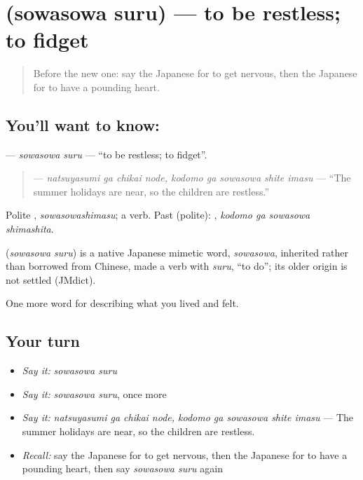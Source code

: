 \section[\texorpdfstring{\ja{そわそわする} (sowasowa suru)}{そわそわする (sowasowa suru)}]{ (sowasowa suru) — to be restless; to fidget}

\label{lesson:JA-C427-sowasowa-suru}



\begin{quote}
Before the new one: say the Japanese for to get nervous, then the Japanese for to have a pounding heart.
\end{quote}

\subsection*{You'll want to know: }
\textbf{} — \emph{sowasowa suru} — \textquotedblleft{}to be restless; to fidget\textquotedblright{}.

\begin{quote}
\textbf{  } — \emph{natsuyasumi ga chikai node, kodomo ga sowasowa shite imasu} — \textquotedblleft{}The summer holidays are near, so the children are restless.\textquotedblright{}
\end{quote}

Polite \textbf{}, \emph{sowasowashimasu}; a  verb. Past (polite): \textbf{ }, \emph{kodomo ga sowasowa shimashita}.

\begin{cousinweb}
\textbf{} (\emph{sowasowa suru}) is a native Japanese mimetic word, \emph{sowasowa}, inherited rather than borrowed from Chinese, made a verb with \emph{suru}, \textquotedblleft{}to do\textquotedblright{}; its older origin is not settled (JMdict).
\end{cousinweb}

\begin{grammarlens}[title={What you've built}]
One more word for describing what you lived and felt.
\end{grammarlens}

\subsection*{Your turn}
\begin{itemize}
\raggedright
  \item \emph{Say it:} \emph{sowasowa suru}
  \item \emph{Say it:} \emph{sowasowa suru}, once more
  \item \emph{Say it:} \emph{natsuyasumi ga chikai node, kodomo ga sowasowa shite imasu} — The summer holidays are near, so the children are restless.
  \item \emph{Recall:} say the Japanese for to get nervous, then the Japanese for to have a pounding heart, then say \emph{sowasowa suru} again
\end{itemize}

